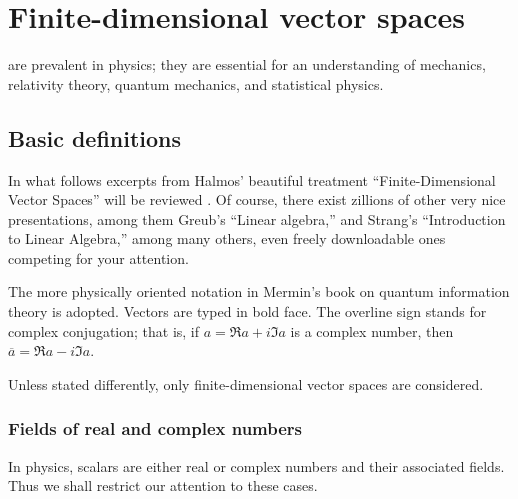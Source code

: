\chapter{Finite-dimensional vector spaces}
\label{ch:lvs}

 are prevalent in physics;
they are essential for an understanding
of mechanics, relativity theory, quantum mechanics, and statistical physics.


\section{Basic definitions}

In what follows excerpts from Halmos' beautiful treatment
``Finite-Dimensional Vector Spaces'' will be reviewed \cite{halmos-vs}.
Of course, there exist zillions of other very nice presentations, among them
Greub's ``Linear algebra,'' and
Strang's ``Introduction to Linear Algebra,''
among many others, even freely downloadable  ones
\cite{Greub75,Strang:2009:ILA,Homes-rorres,lipschutz:schaul-la,Hefferon}
competing for your attention.


The more physically oriented notation in Mermin's book on
quantum information theory \cite{mermin-04,mermin-07} is adopted.
Vectors are typed in bold face.
The overline sign stands for complex conjugation; that is,
if
${a}= \Re a +i\Im a $ is a complex number, then
$\overline{a}= \Re a -i\Im a$.

Unless stated differently, only
finite-dimensional vector spaces are considered.

\subsection{Fields of real and complex numbers}

In physics, scalars are either real or complex numbers and their associated fields.
Thus we shall restrict our attention to these cases.

